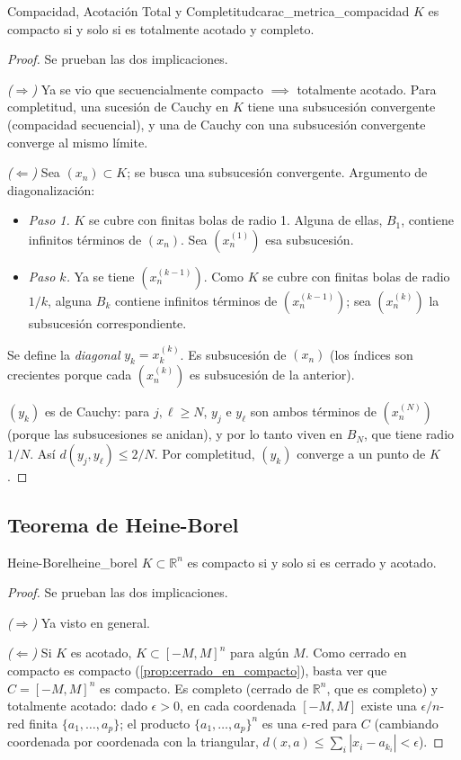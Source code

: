 \documentclass[11pt, a4paper]{article}
\begin{document}
\begin{teorema}{Compacidad, Acotación Total y Completitud}{carac_metrica_compacidad}
$K$ es compacto si y solo si es totalmente acotado y completo.
\end{teorema}

\begin{proof}
Se prueban las dos implicaciones.

\textit{($\Rightarrow$)} Ya se vio que secuencialmente compacto $\implies$ totalmente acotado. Para
completitud, una sucesión de Cauchy en $K$ tiene una subsucesión convergente (compacidad
secuencial), y una de Cauchy con una subsucesión convergente converge al mismo límite.

\textit{($\Leftarrow$)} Sea $(x_n) \subset K$; se busca una subsucesión convergente. Argumento de
diagonalización:
\begin{itemize}
    \item \textit{Paso 1.} $K$ se cubre con finitas bolas de radio 1. Alguna de ellas, $B_1$,
    contiene infinitos términos de $(x_n)$. Sea $(x_n^{(1)})$ esa subsucesión.
    \item \textit{Paso $k$.} Ya se tiene $(x_n^{(k-1)})$. Como $K$ se cubre con finitas bolas de
    radio $1/k$, alguna $B_k$ contiene infinitos términos de $(x_n^{(k-1)})$; sea $(x_n^{(k)})$ la
    subsucesión correspondiente.
\end{itemize}
Se define la \emph{diagonal} $y_k = x_k^{(k)}$. Es subsucesión de $(x_n)$ (los índices son
crecientes porque cada $(x_n^{(k)})$ es subsucesión de la anterior).

$(y_k)$ es de Cauchy: para $j, \ell \ge N$, $y_j$ e $y_\ell$ son ambos términos de $(x_n^{(N)})$
(porque las subsucesiones se anidan), y por lo tanto viven en $B_N$, que tiene radio $1/N$. Así
$d(y_j, y_\ell) \le 2/N$. Por completitud, $(y_k)$ converge a un punto de $K$.
\end{proof}

\subsection{Teorema de Heine-Borel}

\begin{teorema}{Heine-Borel}{heine_borel}
$K \subset \mathbb{R}^n$ es compacto si y solo si es cerrado y acotado.
\end{teorema}

\begin{proof}
Se prueban las dos implicaciones.

\textit{($\Rightarrow$)} Ya visto en general.

\textit{($\Leftarrow$)} Si $K$ es acotado, $K \subset [-M, M]^n$ para algún $M$.
Como cerrado en compacto es compacto (\ref{prop:cerrado_en_compacto}), basta ver que
$C = [-M, M]^n$ es compacto.
Es completo (cerrado de $\mathbb{R}^n$, que es completo) y totalmente acotado:
dado $\epsilon > 0$, en cada coordenada $[-M, M]$ existe una $\epsilon/n$-red finita
$\{a_1, \dots, a_p\}$; el producto $\{a_1, \dots, a_p\}^n$ es una $\epsilon$-red para $C$
(cambiando coordenada por coordenada con la triangular,
$d(x, a) \le \sum_i |x_i - a_{k_i}| < \epsilon$).
\end{proof}
\end{document}
